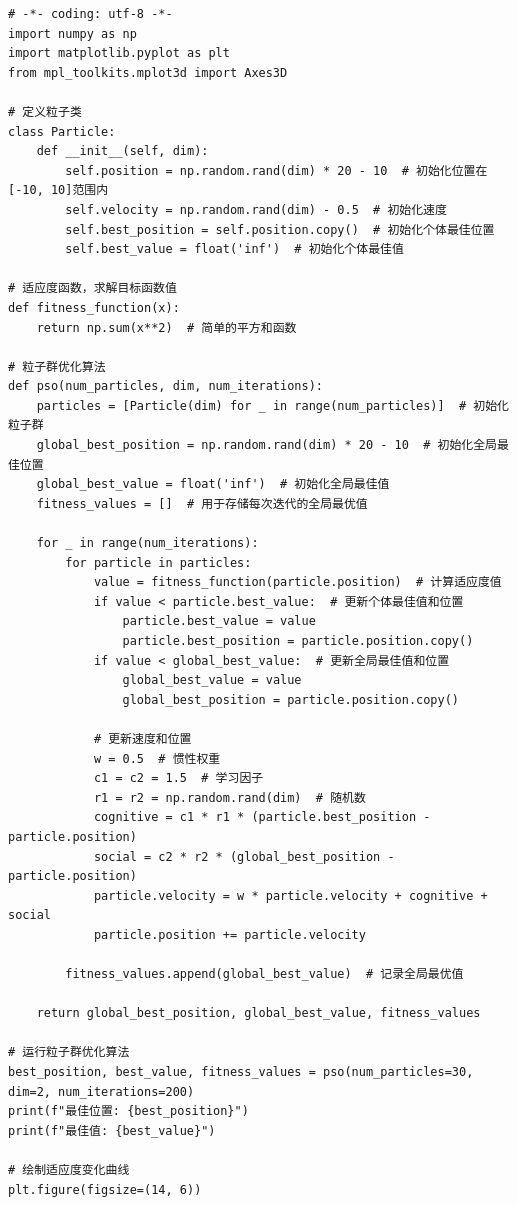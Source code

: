 \documentclass{ctexart}
\begin{document}
\begin{verbatim}
# -*- coding: utf-8 -*-
import numpy as np
import matplotlib.pyplot as plt
from mpl_toolkits.mplot3d import Axes3D

# 定义粒子类
class Particle:
    def __init__(self, dim):
        self.position = np.random.rand(dim) * 20 - 10  # 初始化位置在[-10, 10]范围内
        self.velocity = np.random.rand(dim) - 0.5  # 初始化速度
        self.best_position = self.position.copy()  # 初始化个体最佳位置
        self.best_value = float('inf')  # 初始化个体最佳值

# 适应度函数，求解目标函数值
def fitness_function(x):
    return np.sum(x**2)  # 简单的平方和函数

# 粒子群优化算法
def pso(num_particles, dim, num_iterations):
    particles = [Particle(dim) for _ in range(num_particles)]  # 初始化粒子群
    global_best_position = np.random.rand(dim) * 20 - 10  # 初始化全局最佳位置
    global_best_value = float('inf')  # 初始化全局最佳值
    fitness_values = []  # 用于存储每次迭代的全局最优值

    for _ in range(num_iterations):
        for particle in particles:
            value = fitness_function(particle.position)  # 计算适应度值
            if value < particle.best_value:  # 更新个体最佳值和位置
                particle.best_value = value
                particle.best_position = particle.position.copy()
            if value < global_best_value:  # 更新全局最佳值和位置
                global_best_value = value
                global_best_position = particle.position.copy()
            
            # 更新速度和位置
            w = 0.5  # 惯性权重
            c1 = c2 = 1.5  # 学习因子
            r1 = r2 = np.random.rand(dim)  # 随机数
            cognitive = c1 * r1 * (particle.best_position - particle.position)
            social = c2 * r2 * (global_best_position - particle.position)
            particle.velocity = w * particle.velocity + cognitive + social
            particle.position += particle.velocity
        
        fitness_values.append(global_best_value)  # 记录全局最优值
    
    return global_best_position, global_best_value, fitness_values

# 运行粒子群优化算法
best_position, best_value, fitness_values = pso(num_particles=30, dim=2, num_iterations=200)
print(f"最佳位置: {best_position}")
print(f"最佳值: {best_value}")

# 绘制适应度变化曲线
plt.figure(figsize=(14, 6))


\end{verbatim}
\end{document}
